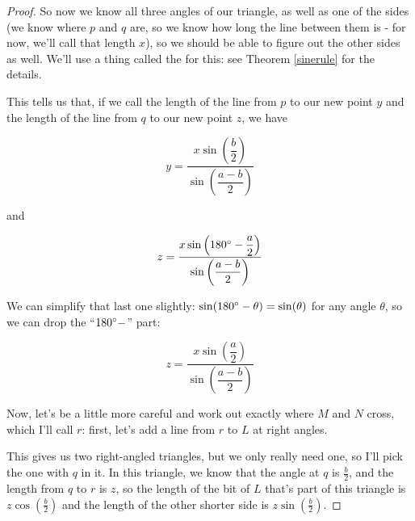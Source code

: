 \begin{proof}
    So now we know all three angles of our triangle, as well as one of the sides (we know where $p$ and $q$ are, so we know how long the line between them is - for now, we'll call that length $x$), so we should be able to figure out the other sides as well. We'll use a thing called the  for this: see Theorem \ref{sinerule} for the details. 

    This tells us that, if we call the length of the line from $p$ to our new point $y$ and the length of the line from $q$ to our new point $z$, we have 

    $$y = \dfrac{x\sin\left(\dfrac{b}{2}\right)}{\sin\left(\dfrac{a-b}{2}\right)}$$

    and 

    $$z = \dfrac{x\sin\left(180\degree - \dfrac{a}{2}\right)}{\sin\left(\dfrac{a-b}{2}\right)}$$

We can simplify that last one slightly: $\sin(180\degree - \theta) = \sin(\theta)$ for any angle $\theta$, so we can drop the ``$180\degree -$'' part: 

    $$z = \dfrac{x\sin\left(\dfrac{a}{2}\right)}{\sin\left(\dfrac{a-b}{2}\right)}$$

Now, let's be a little more careful and work out exactly where $M$ and $N$ cross, which I'll call $r$: first, let's add a line from $r$ to $L$ at right angles. 


This gives us two right-angled triangles, but we only really need one, so I'll pick the one with $q$ in it. In this triangle, we know that the angle at $q$ is $\frac{b}{2}$, and the length from $q$ to $r$ is $z$, so the length of the bit of $L$ that's part of this triangle is $z\cos\left(\frac{b}{2}\right)$ and the length of the other shorter side is $z\sin\left(\frac{b}{2}\right)$. 


\end{proof}
